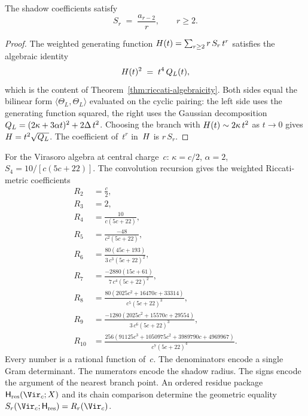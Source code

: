 \begin{theorem}
\label{thm:comp-algebraic-shadow}
\ClaimStatusConditional
The shadow coefficients satisfy
\begin{equation}\label{eq:comp-shadow-from-sqrt}
 S_r \;=\; \frac{a_{r-2}}{r},
 \qquad r \geq 2.
\end{equation}
\end{theorem}

\begin{proof}
The weighted generating function
$H(t) = \sum_{r \geq 2} r\, S_r\, t^r$ satisfies the
algebraic identity
\begin{equation}\label{eq:comp-H-squared}
 H(t)^2 \;=\; t^4\, Q_L(t),
\end{equation}
which is the content of
Theorem~\ref{thm:riccati-algebraicity}. Both sides equal the
bilinear form $\langle \Theta_L, \Theta_L \rangle$ evaluated on
the cyclic pairing: the left side uses the generating function
squared, the right uses the Gaussian decomposition
$Q_L = (2\kappa + 3\alpha t)^2 + 2\Delta\, t^2$.
Choosing the branch with $H(t) \sim 2\kappa\, t^2$
as $t \to 0$ gives $H = t^2 \sqrt{Q_L}$.
The coefficient of~$t^r$ in~$H$ is $r\, S_r$.
\end{proof}

\begin{example}
\label{ex:comp-virasoro-first-ten}
For the Virasoro algebra at central charge~$c$:
$\kappa = c/2$, $\alpha = 2$, $S_4 = 10/[c(5c+22)]$.
The convolution recursion gives the weighted Riccati-metric
coefficients
\begin{align*}
R_2 &= \frac{c}{2}, \\
R_3 &= 2, \\
R_4 &= \frac{10}{c(5c+22)}, \\
R_5 &= \frac{-48}{c^2(5c+22)}, \\
R_6 &= \frac{80(45c+193)}{3\,c^3(5c+22)^2}, \\
R_7 &= \frac{-2880(15c+61)}{7\,c^4(5c+22)^2}, \\
R_8 &= \frac{80(2025c^2 + 16470c + 33314)}{c^5(5c+22)^3}, \\
R_9 &= \frac{-1280(2025c^2 + 15570c + 29554)}{3\,c^6(5c+22)^3}, \\
R_{10} &= \frac{256(91125c^3 + 1050975c^2 + 3989790c + 4969967)}
 {c^7(5c+22)^4}.
\end{align*}
Every number is a rational function of~$c$. The denominators
encode a single Gram determinant. The numerators encode the
shadow radius. The signs encode the argument of the nearest
branch point.  An ordered residue package
$\mathsf H_{\mathrm{res}}(\Vir_c;X)$ and its chain comparison
determine the geometric equality
$S_r(\Vir_c;\mathsf H_{\mathrm{res}})=R_r(\Vir_c)$.
\end{example}

